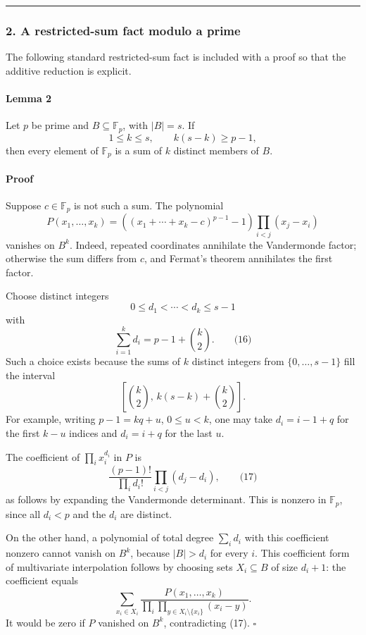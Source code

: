 \documentclass[
  11pt,
  a4paper,
]{article}
\begin{document}
\begin{center}\rule{0.5\linewidth}{0.5pt}\end{center}

\subsubsection{2. A restricted-sum fact modulo a
prime}\label{a-restricted-sum-fact-modulo-a-prime}

The following standard restricted-sum fact is included with a proof so
that the additive reduction is explicit.

\paragraph{Lemma 2}\label{lemma-2}

Let \(p\) be prime and \(B\subseteq\mathbb F_p\), with \(|B|=s\). If \[
1\le k\le s,\qquad k(s-k)\ge p-1,
\] then every element of \(\mathbb F_p\) is a sum of \(k\) distinct
members of \(B\).

\paragraph{Proof}\label{proof-1}

Suppose \(c\in\mathbb F_p\) is not such a sum. The polynomial \[
P(x_1,\ldots,x_k)
=
\left((x_1+\cdots+x_k-c)^{p-1}-1\right)
\prod_{i<j}(x_j-x_i)
\] vanishes on \(B^k\). Indeed, repeated coordinates annihilate the
Vandermonde factor; otherwise the sum differs from \(c\), and Fermat's
theorem annihilates the first factor.

Choose distinct integers \[
0\le d_1<\cdots<d_k\le s-1
\] with \[
\sum_{i=1}^k d_i=p-1+\binom{k}{2}.
\qquad\text{(16)}
\] Such a choice exists because the sums of \(k\) distinct integers from
\(\{0,\ldots,s-1\}\) fill the interval \[
\left[\binom{k}{2},\,
k(s-k)+\binom{k}{2}\right].
\] For example, writing \(p-1=kq+u\), \(0\le u<k\), one may take
\(d_i=i-1+q\) for the first \(k-u\) indices and \(d_i=i+q\) for the last
\(u\).

The coefficient of \(\prod_i x_i^{d_i}\) in \(P\) is \[
\frac{(p-1)!}{\prod_i d_i!}
\prod_{i<j}(d_j-d_i),
\qquad\text{(17)}
\] as follows by expanding the Vandermonde determinant. This is nonzero
in \(\mathbb F_p\), since all \(d_i<p\) and the \(d_i\) are distinct.

On the other hand, a polynomial of total degree \(\sum_i d_i\) with this
coefficient nonzero cannot vanish on \(B^k\), because \(|B|>d_i\) for
every \(i\). This coefficient form of multivariate interpolation follows
by choosing sets \(X_i\subseteq B\) of size \(d_i+1\): the coefficient
equals \[
\sum_{x_i\in X_i}
\frac{P(x_1,\ldots,x_k)}
{\displaystyle\prod_i
 \prod_{y\in X_i\setminus\{x_i\}}(x_i-y)}.
\] It would be zero if \(P\) vanished on \(B^k\), contradicting (17).
\(\square\)
\end{document}
